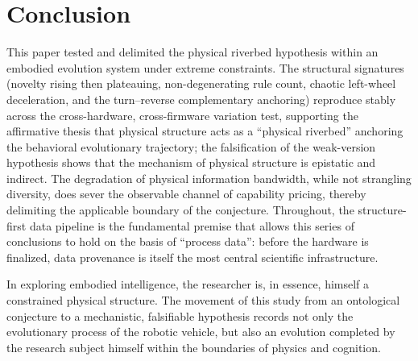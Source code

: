 \documentclass[11pt]{article}
\begin{document}
\section{Conclusion}
This paper tested and delimited the physical riverbed hypothesis within an embodied evolution system under extreme constraints. The structural signatures (novelty rising then plateauing, non-degenerating rule count, chaotic left-wheel deceleration, and the turn--reverse complementary anchoring) reproduce stably across the cross-hardware, cross-firmware variation test, supporting the affirmative thesis that physical structure acts as a ``physical riverbed'' anchoring the behavioral evolutionary trajectory; the falsification of the weak-version hypothesis shows that the mechanism of physical structure is epistatic and indirect. The degradation of physical information bandwidth, while not strangling diversity, does sever the observable channel of capability pricing, thereby delimiting the applicable boundary of the conjecture. Throughout, the structure-first data pipeline is the fundamental premise that allows this series of conclusions to hold on the basis of ``process data'': before the hardware is finalized, data provenance is itself the most central scientific infrastructure.

In exploring embodied intelligence, the researcher is, in essence, himself a constrained physical structure. The movement of this study from an ontological conjecture to a mechanistic, falsifiable hypothesis records not only the evolutionary process of the robotic vehicle, but also an evolution completed by the research subject himself within the boundaries of physics and cognition.
\end{document}
